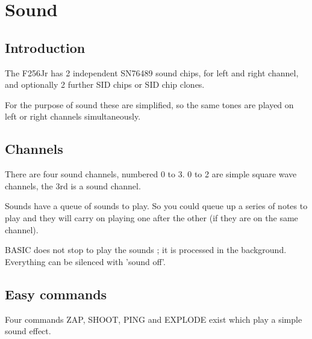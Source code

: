 \chapter{Sound}

\section{Introduction}

The F256Jr has 2 independent SN76489 sound chips, for left and right channel, and optionally 2 further SID chips or SID chip clones.

For the purpose of sound these are simplified, so the same tones are played on left or right channels simultaneously.

\section{Channels}

There are four sound channels, numbered 0 to 3. 0 to 2 are simple square wave channels, the 3rd is a sound channel.

Sounds have a queue of sounds to play. So you could queue up a series of notes to play and they will carry on playing one after the other (if they are on the same channel). 

BASIC does not stop to play the sounds ; it is processed in the background. Everything can be silenced with 'sound off'.

\section{Easy commands}

Four commands ZAP, SHOOT, PING and EXPLODE exist which play a simple sound effect.




